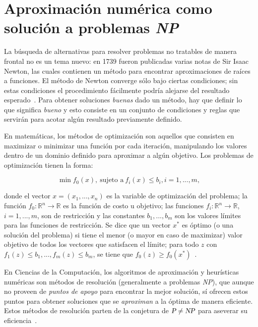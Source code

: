 

\section{Aproximación numérica como solución a problemas \textsl{NP}}

La búsqueda de alternativas para resolver problemas no tratables de manera
frontal no es un tema nuevo: en 1739 fueron publicadas varias notas de Sir
Isaac Newton, las cuales contienen un método para encontrar aproximaciones de
raíces a funciones. El método de Newton converge sólo bajo ciertas condiciones;
sin estas condiciones el procedimiento fácilmente podría alejarse del resultado
esperado~\cite{newton}. Para obtener soluciones \textit{buenas} dado un método,
hay que definir lo que significa \textit{bueno} y esto consiste en un conjunto
de condiciones y reglas que servirán para acotar algún resultado previamente
definido.

En matemáticas, los métodos de optimización son aquellos que consisten en
maximizar o minimizar una función por cada iteración, manipulando los valores
dentro de un dominio definido para aproximar a algún objetivo. Los problemas de
optimización tienen la forma:

\begin{displaymath}
  \min f_{0}(x), ~ \textrm{sujeto a} ~ f_{i}(x) \leq b_{i}, i = 1,...,m,
\end{displaymath}

\noindent donde el vector $x=(x_{1},...,x_{n})$ es la variable de optimización
del problema; la función $f_{0}: \mathbb{R}^{n} \rightarrow \mathbb{R}$ es la
función de costo u objetivo; las funciones
$f_{i}: \mathbb{R}^{n} \rightarrow \mathbb{R}$, $i = 1,...,m$, son de
restricción y las constantes $b_{1},...,b_{m}$ son los valores límites para las
funciones de restricción. Se dice que un vector $x^{*}$ es óptimo (o una
solución del problema) si tiene el menor (o mayor en caso de maximizar) valor objetivo de todos los vectores
que satisfacen el límite; para todo $z$ con
$f_{1}(z) \leq b_{1}, ..., f_{m}(z) \leq b_{m}$, se tiene que
$f_{0}(z) \geq f_{0}(x^{*})$~\cite{Boyd:2004:CO:993483}.

En Ciencias de la Computación, los algoritmos de aproximación y heurísticas
numéricas son métodos de resolución (generalmente a problemas \textsl{NP}), que
aunque no proveen de \textit{puntos de apoyo} para encontrar la mejor solución,
sí ofrecen estos puntos para obtener soluciones que se \emph{aproximan} a la
óptima de manera eficiente. Estos métodos de resolución parten de la conjetura
de $\textsl{P} \neq \textsl{NP}$ para aseverar su
eficiencia~\cite{Vazirani:2001:AA:500776}.

